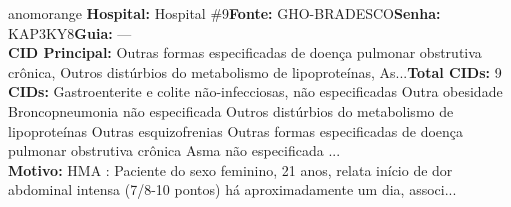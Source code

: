 \documentclass[a4paper,10pt]{article}
\begin{document}
\begin{anomalycard}[Interna\c{c}\~{a}o \#120992 | Pac. \#100273 | ALTO (z=4.90) | LOS: 3d | 10/03/2026\,$\to$\,13/03/2026]{anomorange}
\textbf{Hospital:} Hospital \#9\quad \textbf{Fonte:} GHO-BRADESCO\quad \textbf{Senha:} KAP3KY8\quad \textbf{Guia:} ---\\

\textbf{CID Principal:} {\small Outras formas especificadas de doença pulmonar obstrutiva crônica, Outros distúrbios do metabolismo de lipoproteínas, As...}\quad\textbf{Total CIDs:} 9\\

\textbf{CIDs:} {\scriptsize Gastroenterite e colite não-infecciosas, não especificadas \textbar{} Outra obesidade \textbar{} Broncopneumonia não especificada \textbar{} Outros distúrbios do metabolismo de lipoproteínas \textbar{} Outras esquizofrenias \textbar{} Outras formas especificadas de doença pulmonar obstrutiva crônica \textbar{} Asma não especificada ...}\\

\textbf{Motivo:} {\scriptsize HMA : Paciente do sexo feminino, 21 anos, relata início de dor abdominal intensa (7/8-10 pontos) há aproximadamente um dia, associ...}\\




\end{anomalycard}
\end{document}
